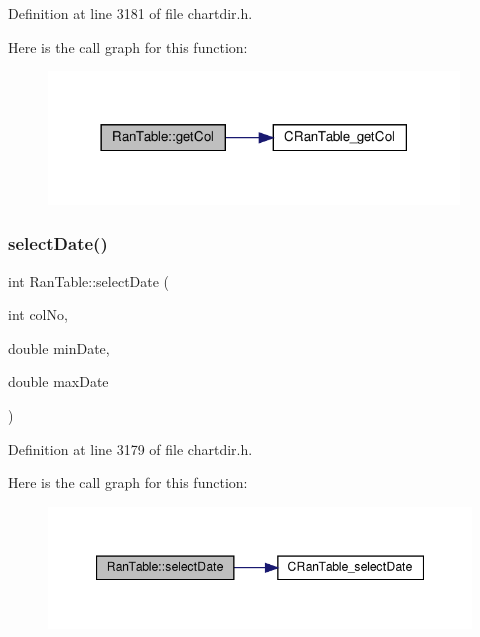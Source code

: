 Definition at line 3181 of file chartdir.\+h.

Here is the call graph for this function\+:
\nopagebreak
\begin{figure}[H]
\begin{center}
\leavevmode
\includegraphics[width=309pt]{class_ran_table_a98c2e1df04ab232b51c6f089a411f99f_cgraph}
\end{center}
\end{figure}
\mbox{\label{class_ran_table_aa489b68e8f30adb5ee5a38ffef4209b0}} 
\subsubsection{\texorpdfstring{select\+Date()}{selectDate()}}
{\footnotesize\ttfamily int Ran\+Table\+::select\+Date (\begin{DoxyParamCaption}\item[{int}]{col\+No,  }\item[{double}]{min\+Date,  }\item[{double}]{max\+Date }\end{DoxyParamCaption})\hspace{0.3cm}{\ttfamily [inline]}}



Definition at line 3179 of file chartdir.\+h.

Here is the call graph for this function\+:
\nopagebreak
\begin{figure}[H]
\begin{center}
\leavevmode
\includegraphics[width=347pt]{class_ran_table_aa489b68e8f30adb5ee5a38ffef4209b0_cgraph}
\end{center}
\end{figure}
\mbox{\label{class_ran_table_a5f1d2400ce4a5c3c2d221cf04e27982c}} 
